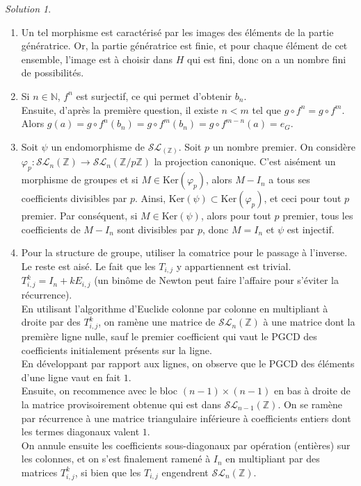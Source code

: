 \documentclass[french]{book}
\newcommand{\N}{\mathbb{N}}
\newcommand{\Z}{\mathbb{Z}}
\renewcommand{\ker}{\text{Ker}}
\theoremstyle{definition}
\theoremstyle{remark}
\newtheorem*{sol}{Solution}
\begin{document}
\begin{sol}
	\begin{enumerate}
		\item Un tel morphisme est caractérisé par les images des éléments de la partie génératrice. Or, la partie génératrice est finie, et pour chaque élément de cet ensemble, l'image est à choisir dans $H$ qui est fini, donc on a un nombre fini de possibilités.
		\item Si $n\in\N$, $f^n$ est surjectif, ce qui permet d'obtenir $b_n$.\\
		Ensuite, d'après la première question, il existe $n<m$ tel que $g\circ f^n=g\circ f^m$. Alors $g(a)=g\circ f^n(b_n)=g\circ f^m(b_n)=g\circ f^{m-n}(a)=e_G$.
		\item Soit $\psi$ un endomorphisme de $\mathcal{SL}_(\Z)$. Soit $p$ un nombre premier. On considère $\varphi_p:\mathcal{SL}_n(\Z)\to\mathcal{SL}_n(\Z/p\Z)$ la projection canonique. C'est aisément un morphisme de groupes et si $M\in\ker(\varphi_p)$, alors $M-I_n$ a tous ses coefficients divisibles par $p$. Ainsi, $\ker(\psi)\subset\ker(\varphi_p)$, et ceci pour tout $p$ premier. Par conséquent, si $M\in\ker(\psi)$, alors pour tout $p$ premier, tous les coefficients de $M-I_n$ sont divisibles par $p$, donc $M=I_n$ et $\psi$ est injectif.
		\item Pour la structure de groupe, utiliser la comatrice pour le passage à l'inverse. Le reste est aisé. Le fait que les $T_{i,j}$ y appartiennent est trivial. \\
		$T_{i,j}^k=I_n+kE_{i,j}$ (un binôme de Newton peut faire l'affaire pour s'éviter la récurrence). \\
		En utilisant l'algorithme d'Euclide colonne par colonne en multipliant à droite par des $T_{i,j}^k$, on ramène une matrice de $\mathcal{SL}_n(\Z)$ à une matrice dont la première ligne nulle, sauf le premier coefficient qui vaut le PGCD des coefficients initialement présents sur la ligne. \\
		En développant par rapport aux lignes, on observe que le PGCD des éléments d'une ligne vaut en fait $1$. \\
		Ensuite, on recommence avec le bloc $(n-1)\times (n-1)$ en bas à droite de la matrice provisoirement obtenue qui est dans $\mathcal{SL}_{n-1}(\Z)$. On se ramène par récurrence à une matrice triangulaire inférieure à coefficients entiers dont les termes diagonaux valent $1$.\\
		On annule ensuite les coefficients sous-diagonaux par opération (entières) sur les colonnes, et on s'est finalement ramené à $I_n$ en multipliant par des matrices $T_{i,j}^k$, si bien que les $T_{i,j}$ engendrent $\mathcal{SL}_n(\Z)$.
	\end{enumerate}
\end{sol}
\end{document}

